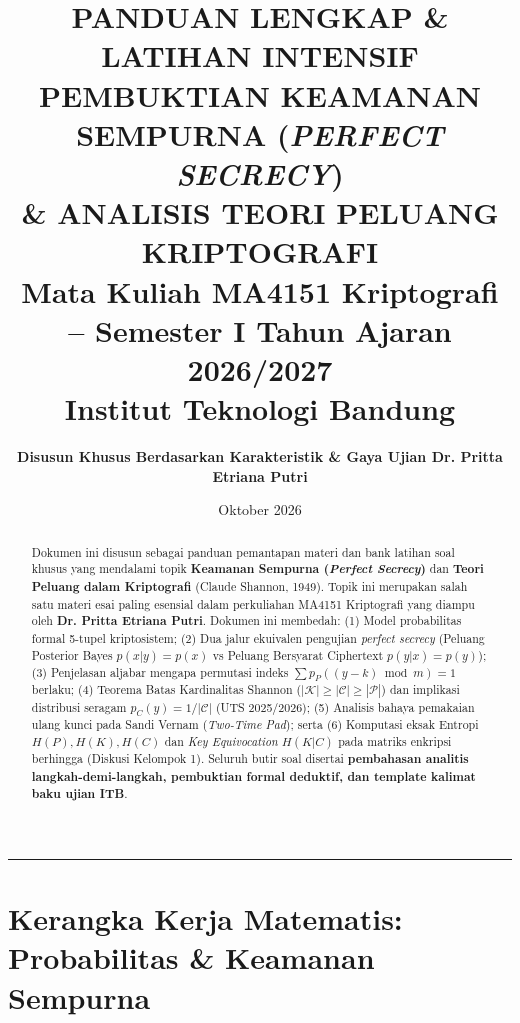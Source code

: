 \documentclass[11pt,a4paper]{article}
\title{
    \vspace{-1.5cm}
    \textbf{\huge PANDUAN LENGKAP \& LATIHAN INTENSIF}\\[0.2cm]
    \textbf{\Large PEMBUKTIAN KEAMANAN SEMPURNA (\textit{PERFECT SECRECY})}\\[0.2cm]
    \textbf{\Large \& ANALISIS TEORI PELUANG KRIPTOGRAFI}\\[0.3cm]
    \large Mata Kuliah MA4151 Kriptografi -- Semester I Tahun Ajaran 2026/2027\\[0.1cm]
    \large Institut Teknologi Bandung
}
\author{\textbf{Disusun Khusus Berdasarkan Karakteristik \& Gaya Ujian Dr. Pritta Etriana Putri}}
\date{Oktober 2026}
\begin{document}
\maketitle
\vspace{-0.5cm}

\begin{abstract}
Dokumen ini disusun sebagai panduan pemantapan materi dan bank latihan soal khusus yang mendalami topik \textbf{Keamanan Sempurna (\textit{Perfect Secrecy})} dan \textbf{Teori Peluang dalam Kriptografi} (Claude Shannon, 1949). Topik ini merupakan salah satu materi esai paling esensial dalam perkuliahan MA4151 Kriptografi yang diampu oleh \textbf{Dr. Pritta Etriana Putri}. Dokumen ini membedah: (1) Model probabilitas formal 5-tupel kriptosistem; (2) Dua jalur ekuivalen pengujian \textit{perfect secrecy} (Peluang Posterior Bayes $p(x|y)=p(x)$ vs Peluang Bersyarat Ciphertext $p(y|x)=p(y)$); (3) Penjelasan aljabar mengapa permutasi indeks $\sum p_P((y-k)\bmod m) = 1$ berlaku; (4) Teorema Batas Kardinalitas Shannon ($|\mathcal{K}| \ge |\mathcal{C}| \ge |\mathcal{P}|$) dan implikasi distribusi seragam $p_C(y) = 1/|\mathcal{C}|$ (UTS 2025/2026); (5) Analisis bahaya pemakaian ulang kunci pada Sandi Vernam (\textit{Two-Time Pad}); serta (6) Komputasi eksak Entropi $H(P), H(K), H(C)$ dan \textit{Key Equivocation} $H(K|C)$ pada matriks enkripsi berhingga (Diskusi Kelompok 1). Seluruh butir soal disertai \textbf{pembahasan analitis langkah-demi-langkah, pembuktian formal deduktif, dan template kalimat baku ujian ITB}.
\end{abstract}

\vspace{0.2cm}
\hrule
\vspace{0.3cm}

\tableofcontents
\newpage

\section{Kerangka Kerja Matematis: Probabilitas \& Keamanan Sempurna}
\end{document}
